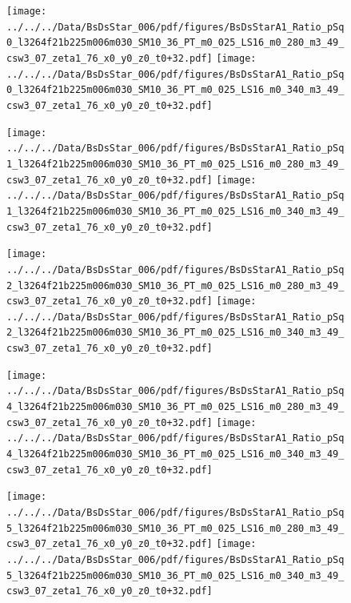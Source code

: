 \documentclass[a4paper,10pt]{article}
\begin{document}
\begin{figure}[p]
 \texttt{[image: ../../../Data/BsDsStar\_006/pdf/figures/BsDsStarA1\_Ratio\_pSq0\_l3264f21b225m006m030\_SM10\_36\_PT\_m0\_025\_LS16\_m0\_280\_m3\_49\_csw3\_07\_zeta1\_76\_x0\_y0\_z0\_t0+32.pdf]} 
 \texttt{[image: ../../../Data/BsDsStar\_006/pdf/figures/BsDsStarA1\_Ratio\_pSq0\_l3264f21b225m006m030\_SM10\_36\_PT\_m0\_025\_LS16\_m0\_340\_m3\_49\_csw3\_07\_zeta1\_76\_x0\_y0\_z0\_t0+32.pdf]} 
 \end{figure}
\begin{figure}[p]
 \texttt{[image: ../../../Data/BsDsStar\_006/pdf/figures/BsDsStarA1\_Ratio\_pSq1\_l3264f21b225m006m030\_SM10\_36\_PT\_m0\_025\_LS16\_m0\_280\_m3\_49\_csw3\_07\_zeta1\_76\_x0\_y0\_z0\_t0+32.pdf]} 
 \texttt{[image: ../../../Data/BsDsStar\_006/pdf/figures/BsDsStarA1\_Ratio\_pSq1\_l3264f21b225m006m030\_SM10\_36\_PT\_m0\_025\_LS16\_m0\_340\_m3\_49\_csw3\_07\_zeta1\_76\_x0\_y0\_z0\_t0+32.pdf]} 
 \end{figure}
\begin{figure}[p]
 \texttt{[image: ../../../Data/BsDsStar\_006/pdf/figures/BsDsStarA1\_Ratio\_pSq2\_l3264f21b225m006m030\_SM10\_36\_PT\_m0\_025\_LS16\_m0\_280\_m3\_49\_csw3\_07\_zeta1\_76\_x0\_y0\_z0\_t0+32.pdf]} 
 \texttt{[image: ../../../Data/BsDsStar\_006/pdf/figures/BsDsStarA1\_Ratio\_pSq2\_l3264f21b225m006m030\_SM10\_36\_PT\_m0\_025\_LS16\_m0\_340\_m3\_49\_csw3\_07\_zeta1\_76\_x0\_y0\_z0\_t0+32.pdf]} 
 \end{figure}
\clearpage
\begin{figure}[p]
 \texttt{[image: ../../../Data/BsDsStar\_006/pdf/figures/BsDsStarA1\_Ratio\_pSq4\_l3264f21b225m006m030\_SM10\_36\_PT\_m0\_025\_LS16\_m0\_280\_m3\_49\_csw3\_07\_zeta1\_76\_x0\_y0\_z0\_t0+32.pdf]} 
 \texttt{[image: ../../../Data/BsDsStar\_006/pdf/figures/BsDsStarA1\_Ratio\_pSq4\_l3264f21b225m006m030\_SM10\_36\_PT\_m0\_025\_LS16\_m0\_340\_m3\_49\_csw3\_07\_zeta1\_76\_x0\_y0\_z0\_t0+32.pdf]} 
 \end{figure}
\begin{figure}[p]
 \texttt{[image: ../../../Data/BsDsStar\_006/pdf/figures/BsDsStarA1\_Ratio\_pSq5\_l3264f21b225m006m030\_SM10\_36\_PT\_m0\_025\_LS16\_m0\_280\_m3\_49\_csw3\_07\_zeta1\_76\_x0\_y0\_z0\_t0+32.pdf]} 
 \texttt{[image: ../../../Data/BsDsStar\_006/pdf/figures/BsDsStarA1\_Ratio\_pSq5\_l3264f21b225m006m030\_SM10\_36\_PT\_m0\_025\_LS16\_m0\_340\_m3\_49\_csw3\_07\_zeta1\_76\_x0\_y0\_z0\_t0+32.pdf]} 
 \end{figure}
\clearpage
\end{document}
